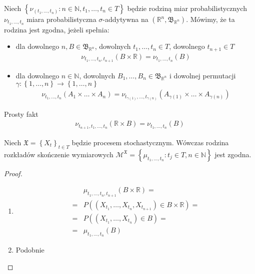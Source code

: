 \begin{defi}
Niech $ \left\{\nu_{(t_1,\dots,t_n)}:n\in \mathbb N ,t_1,\dots,t_n\in T\right\} $ będzie rodziną miar probabilistycznych\\$ \nu_{t_1,\dots,t_n} $ miara probabilistyczna $ \sigma $-addytywna na $ \left(\mathbb R ^n,\mathfrak B_{\mathbb R ^n}\right) $. Mówimy, że ta rodzina jest zgodna, jeżeli spełnia:
\begin{itemize}
\item dla dowolnego $ n,B\in \mathfrak B_{\mathbb R ^n} $, dowolnych $ t_1,\dots,t_n\in T $, dowolnego $ t_{n+1}\in T $
\begin{gather*}
\nu_{t_1,\dots,t_n,t_{n+1}}\left(B\times \mathbb R \right)=
\nu_{t_1,\dots,t_n}(B)
\end{gather*}
\item dla dowolnego $ n\in \mathbb N $, dowolnych $ B_1,\dots,B_n\in \mathfrak B_{\mathbb R ^n} $ i dowolnej permutacji $ \gamma:\left\{1,\dots,n\right\}\to \left\{1,\dots,n\right\} $
\begin{gather*}
\nu_{t_1,\dots,t_n}\left(A_1\times\dots\times A_n\right)=
\nu_{t_{\gamma(1)},\dots,t_{\gamma(n)}}\left(A_{\gamma(1)}\times\dots\times A_{\gamma(n)}\right)
\end{gather*}
\end{itemize}
\end{defi}
Prosty fakt
\begin{gather*}
\nu_{t_{n+1},t_1,\dots,t_n}\left(\mathbb R \times B\right)=
\nu_{t_1,\dots,t_n}\left(B\right)
\end{gather*}
\begin{twr}
Niech $ \mathfrak X=\left\{X_t\right\}_{t\in T} $ będzie procesem stochastycznym. Wówczas rodzina rozkładów skończenie wymiarowych $ \mathcal M^\mathfrak X=\left\{\mu_{t_1,\dots,t_n}:t_j\in T,n\in \mathbb N \right\} $ jest zgodna.
\begin{proof}
\begin{enumerate}
\item
\begin{align*}
&\mu_{t_1,\dots,t_n,t_{n+1}}\left(B\times \mathbb R \right)
=\\=&
P\left(\left(X_{t_1},\dots,X_{t_n},X_{t_{n+1}}\right)\in B\times \mathbb R \right)
=\\=&
P\left(\left(X_{t_1},\dots,X_{t_n}\right)\in B\right)
=\\=&
\mu_{t_1,\dots,t_n}\left(B\right)
\end{align*}
\item Podobnie
\end{enumerate}
\end{proof}
\end{twr}
